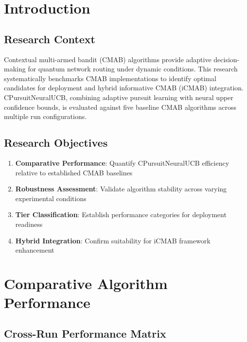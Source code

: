 \documentclass[12pt,a4paper]{article}
\begin{document}
\newpage
\section{Introduction}

\subsection{Research Context}

Contextual multi-armed bandit (CMAB) algorithms provide adaptive decision-making for quantum network routing under dynamic conditions. This research systematically benchmarks CMAB implementations to identify optimal candidates for deployment and hybrid informative CMAB (iCMAB) integration. CPursuitNeuralUCB, combining adaptive pursuit learning with neural upper confidence bounds, is evaluated against five baseline CMAB algorithms across multiple run configurations.

\subsection{Research Objectives}

\begin{enumerate}
\item \textbf{Comparative Performance}: Quantify CPursuitNeuralUCB efficiency relative to established CMAB baselines
\item \textbf{Robustness Assessment}: Validate algorithm stability across varying experimental conditions
\item \textbf{Tier Classification}: Establish performance categories for deployment readiness
\item \textbf{Hybrid Integration}: Confirm suitability for iCMAB framework enhancement
\end{enumerate}

\section{Comparative Algorithm Performance}

\subsection{Cross-Run Performance Matrix}
\end{document}
